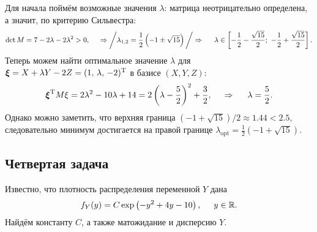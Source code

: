 Для начала поймём возможные значения $\lambda$: матрица неотрицательно определена, а значит, по критерию Сильвестра:
\begin{equation*}
    \det M = 7 - 2 \lambda - 2 \lambda^2 > 0,
    \hspace{0.5cm} \Rightarrow \bigg/
        \lambda_{1,2} = \frac{1}{2}\left(-1\pm \sqrt{15}\right)
    \bigg/
    \Rightarrow
    \hspace{5 mm} 
    \lambda \in \left[
        -\frac{1}{2}-\frac{\sqrt{15}}{2};\ 
        -\frac{1}{2}+\frac{\sqrt{15}}{2}
    \right].
\end{equation*}
Теперь можем найти оптимальное значение $\lambda$ для $\mbox{\boldmath $\xi$} = X + \lambda Y - 2 Z = (1,\, \lambda,\, -2)^{\text{T}}$ в базисе $(X, Y, Z)$:
\begin{equation*}
    \mbox{\boldmath $\xi$}^{\text{T}} M \xi = 2\lambda^2 - 10 \lambda + 14 = 2\left(\lambda- \frac{5}{2}\right)^2 + \frac{3}{2},
    \hspace{0.5cm} \Rightarrow \hspace{0.5cm}
    \lambda = \frac{5}{2}.
\end{equation*}
Однако можно заметить, что верхняя граница $(-1 + \sqrt{15})/2 \approx 1.44 < 2.5$, следовательно минимум достигается на правой границе $\lambda_{\text{opt}} = \frac{1}{2}\left(-1 + \sqrt{15}\right)$. 












\subsection*{Четвертая задача}
Известно, что плотность распределения переменной $Y$ дана
\begin{equation*}
    f_Y(y) = C \exp\left(
        - y^2 + 4y - 10 
    \right), \hspace{5 mm} y \in \mathbb{R}.
\end{equation*}
Найдём константу $C$, а также матожидание и дисперсию $Y$. 

